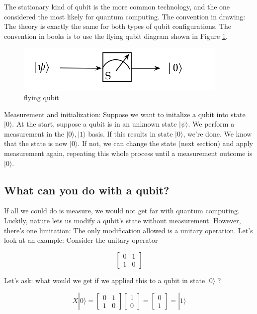 \documentclass[main.tex]{subfiles}
\begin{document}
    The stationary kind of qubit is the more common technology, and the one considered the most likely for quantum computing. The convention in drawing: The theory is exactly the same for both types of qubit configurations. The convention in books is to use the flying qubit diagram shown in Figure \ref{fig:18qubit10}.
    
    \begin{figure}
        \centering
        \includegraphics[width=4in]{notes/figs/n05/18qubit10.png}
        \caption{flying qubit}
        \label{fig:18qubit10}
    \end{figure}
    
    Measurement and initialization: Suppose we want to initalize a qubit into state $|0\rangle$. At the start, suppose a qubit is in an unknown state $|\psi\rangle$. We perform a measurement in the $|0\rangle,|1\rangle$ basis. If this results in state $|0\rangle$, we're done. We know that the state is now $|0\rangle$. If not, we can change the state (next section) and apply measurement again, repeating this whole process until a measurement outcome is $|0\rangle$.

\subsection{What can you do with a qubit?}

    If all we could do is measure, we would not get far with quantum computing. Luckily, nature lets us modify a qubit's state without measurement. However, there's one limitation: The only modification allowed is a unitary operation. Let's look at an example: Consider the unitary operator
    
    $$
    \left[\begin{array}{ll}
    0 & 1 \\
    1 & 0
    \end{array}\right]
    $$
    
    Let's ask: what would we get if we applied this to a qubit in state $|0\rangle$ ?
    
    $$
    X|0\rangle=\left[\begin{array}{ll}
    0 & 1 \\
    1 & 0
    \end{array}\right]\left[\begin{array}{l}
    1 \\
    0
    \end{array}\right]=\left[\begin{array}{l}
    0 \\
    1
    \end{array}\right]=|1\rangle
    $$
    
\end{document}

